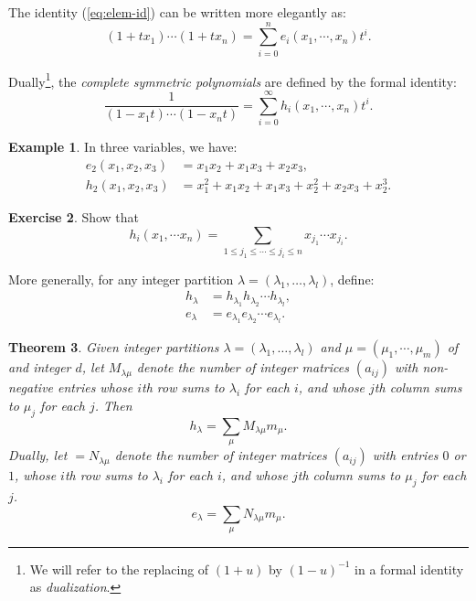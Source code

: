 \documentclass[12pt]{amsart}
\newtheorem{theorem}{Theorem}[subsection]
\theoremstyle{definition}
\theoremstyle{example}
\newtheorem{example}[theorem]{Example}
\newtheorem{exercise}[theorem]{Exercise}
\begin{document}
The identity (\ref{eq:elem-id}) can be written more elegantly as:
\begin{displaymath}
  (1+t x_1) \dotsb (1+tx_n) = \sum_{i=0}^n e_i(x_1,\dotsb, x_n)t^i.
\end{displaymath}

Dually\footnote{We will refer to the replacing of $(1+u)$ by $(1-u)^{-1}$ in a formal identity as \emph{dualization}.}, the \emph{complete symmetric polynomials} are defined by the formal identity:
\begin{displaymath}
  \frac 1{(1-x_1t)\dotsb (1-x_nt)} = \sum_{i=0}^\infty h_i(x_1,\dotsb, x_n)t^i.
\end{displaymath}
\begin{example}
  In three variables, we have:
  \begin{align*}
    e_2(x_1,x_2,x_3) & = x_1x_2 + x_1x_3 + x_2x_3,\\
    h_2(x_1,x_2,x_3) & = x_1^2 + x_1x_2 + x_1x_3 + x_2^2 + x_2x_3 + x_2^3.
  \end{align*}
\end{example}
\begin{exercise}
  Show that
  \begin{displaymath}
    h_i(x_1,\dotsb x_n) = \sum_{1\leq j_1\leq \dotsb \leq j_i\leq n} x_{j_1}\dotsb x_{j_i}.
  \end{displaymath}
\end{exercise}
More generally, for any integer partition $\lambda=(\lambda_1,\dotsc, \lambda_l)$, define:
\begin{align*}
  h_\lambda &= h_{\lambda_1} h_{\lambda_2}\dotsb h_{\lambda_l},\\
  e_\lambda &= e_{\lambda_1} e_{\lambda_2}\dotsb e_{\lambda_l}.
\end{align*}
\begin{theorem}
  Given integer partitions $\lambda=(\lambda_1,\dotsc,\lambda_l)$ and $\mu=(\mu_1,\dotsb, \mu_m)$ of and integer $d$, let $M_{\lambda\mu}$ denote the number of integer matrices $(a_{ij})$ with non-negative entries whose $i$th row sums to $\lambda_i$ for each $i$, and whose $j$th column sums to $\mu_j$ for each $j$.
  Then
  \begin{displaymath}
    h_\lambda = \sum_\mu M_{\lambda\mu} m_\mu.
  \end{displaymath}
  Dually, let $=N_{\lambda\mu}$ denote the number of integer matrices $(a_{ij})$ with entries $0$ or $1$, whose $i$th row sums to $\lambda_i$ for each $i$, and whose $j$th column sums to $\mu_j$ for each $j$.
  \begin{displaymath}
    e_\lambda = \sum_\mu N_{\lambda\mu} m_\mu.
  \end{displaymath}
\end{theorem}
\end{document}
